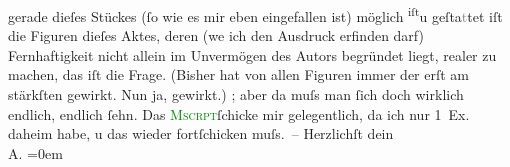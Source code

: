                gerade dieſes Stückes (ſo wie es mir eben eingefallen ist) \introOben{}möglich \substVorne{}\textsuperscript{iſt}\substDazwischen{}u\substHinten{} geſta\textcolor{gray}{t}tet iſt\introOben{} die Figuren dieſes Aktes, deren
                  (we{\geminationn} ich den Ausdruck erfinden darf) Fernhaftigkeit
               nicht allein im Unvermögen des Autors begründet liegt, realer zu machen, das iſt die
               Frage. (Bisher hat von allen Figuren immer der erſt am stärkſten gewirkt. Nun ja, gewirkt.)\pend
           \pstart
           \label{K_L01549_1v}\label{K_L01549_1h}; aber da{\geminationn} muſs man ſich doch wirklich
               endlich, endlich ſehn. Das \textcolor{green}{\textsc{Mscrpt}}{}ſchicke mir gelegentlich, da ich nur 1 Ex.
               daheim habe, u das wieder fortſchicken muſs. – \pend
           \pstart
           Herzlichſt dein{\\[\baselineskip]}\spacefill\mbox{A.}\pend
           \leftskip=0em{}\endnumbering{}  
      